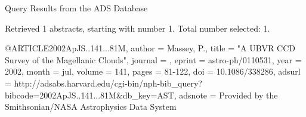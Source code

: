 Query Results from the ADS Database


Retrieved 1 abstracts, starting with number 1.  Total number selected: 1.

@ARTICLE{2002ApJS..141...81M,
   author = {{Massey}, P.},
    title = "{A UBVR CCD Survey of the Magellanic Clouds}",
  journal = {\apjs},
   eprint = {astro-ph/0110531},
     year = 2002,
    month = jul,
   volume = 141,
    pages = {81-122},
      doi = {10.1086/338286},
   adsurl = {http://adsabs.harvard.edu/cgi-bin/nph-bib_query?bibcode=2002ApJS..141...81M&db_key=AST},
  adsnote = {Provided by the Smithsonian/NASA Astrophysics Data System}
}


